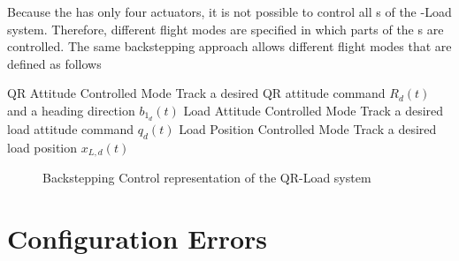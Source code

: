 Because the  has only four actuators, it is not possible to control all s of the -Load system. Therefore, different flight modes are specified in which parts of the s are controlled. The same backstepping approach allows different flight modes that are defined as follows
\begin{outline}
\1 QR Attitude Controlled Mode 
\2 Track a desired QR attitude command $ R_d(t) $ and a heading direction $ b_{1_d}(t) $
\1 Load Attitude Controlled Mode 
\2 Track a desired load attitude command $ q_d(t) $
\1 Load Position Controlled Mode
\2 Track a desired load position $ x_{L,d}(t) $
\end{outline}

\begin{figure}[h!]
	\centering
	\caption{Backstepping Control representation of the QR-Load system\label{fig:con.backstepQRL}}
\end{figure}		

\section{Configuration Errors}

